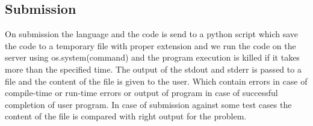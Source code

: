 \documentclass{article}
\begin{document}
\vspace{1.4cm}

\subsection{Submission}
On submission the language and the code is send to a python script which save the code to a temporary file with proper extension and we run the code on the server using os.system(command) and the program execution is killed if it takes more than the specified time. The output of the stdout and stderr is passed to a file and the content of the file is given to the user. Which contain errors in case of compile-time or run-time errors or output of program in case of successful completion of user program.
In case of submission against some test cases the content of the file is compared with right output for the problem.
\end{document}

